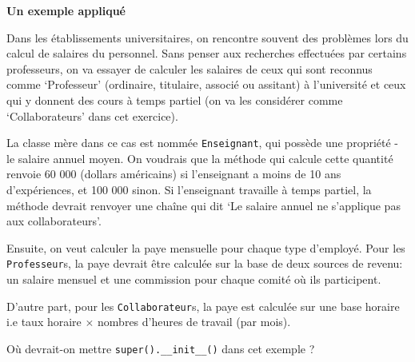 	\begin{Exercice}[15 minutes]\textbf{Un exemple appliqué}

	Dans les établissements universitaires, on rencontre souvent des problèmes lors du calcul de salaires du personnel. Sans penser aux recherches effectuées par certains professeurs, on va essayer de calculer les salaires de ceux qui sont reconnus comme `Professeur' (ordinaire, titulaire, associé ou assitant) à l'université et ceux qui y donnent des cours à temps partiel (on va les considérer comme `Collaborateurs' dans cet exercice).

	La classe mère dans ce cas est nommée \lstinline{Enseignant}, qui possède une propriété - le salaire annuel moyen. On voudrais que la méthode qui calcule cette quantité renvoie 60 000 (dollars américains) si l'enseignant a moins de 10 ans d'expériences, et 100 000 sinon. Si l'enseignant travaille à temps partiel, la méthode devrait renvoyer une chaîne qui dit `Le salaire annuel ne s'applique pas aux collaborateurs'.

	Ensuite, on veut calculer la paye mensuelle pour chaque type d'employé. Pour les \lstinline{Professeur}s, la paye devrait être calculée sur la base de deux sources de revenu: un salaire mensuel et une commission pour chaque comité où ils participent. 

	D'autre part, pour les \lstinline{Collaborateur}s, la paye est calculée sur une base horaire i.e taux horaire $\times$ nombres d'heures de travail (par mois).
	 

	\begin{conseil}
	Où devrait-on mettre \lstinline{super().__init__()} dans cet exemple ?
	\end{conseil}

	\begin{solution}
	 
	\end{solution}
	\end{Exercice}


